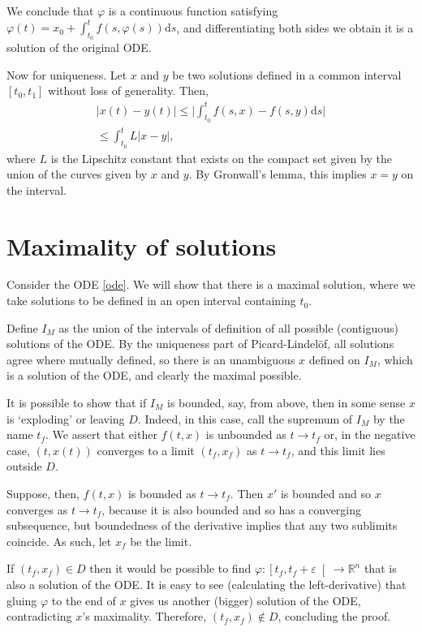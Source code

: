 \documentclass{article}
\newcommand{\R}{\mathbb{R}}
\newcommand{\dd}{\mathrm{d}}
\begin{document}
We conclude that $\varphi$ is a continuous function satisfying $\varphi(t) = x_0 + \int_{t_0}^t f(s, \varphi(s)) \dd s$, and differentiating both sides we obtain it is a solution of the original ODE.

Now for uniqueness. Let $x$ and $y$ be two solutions defined in a common interval $[t_0, t_1]$ without loss of generality. Then,
\begin{align*}
\lvert x(t) - y(t) \rvert \leq \lvert \int_{t_0}^t f(s,x) - f(s,y) \dd s \rvert\\
\leq \int_{t_0}^t L \lvert x - y \rvert,
\end{align*}
where $L$ is the Lipschitz constant that exists on the compact set given by the union of the curves given by $x$ and $y$. By Gronwall's lemma, this implies $x = y$ on the interval.

\section{Maximality of solutions}

Consider the ODE \eqref{ode}. We will show that there is a maximal solution, where we take solutions to be defined in an open interval containing $t_0$.

Define $I_M$ as the union of the intervals of definition of all possible (contiguous) solutions of the ODE. By the uniqueness part of Picard-Lindelöf, all solutions agree where mutually defined, so there is an unambiguous $x$ defined on $I_M$, which is a solution of the ODE, and clearly the maximal possible.

It is possible to show that if $I_M$ is bounded, say, from above, then in some sense $x$ is `exploding' or leaving $D$. Indeed, in this case, call the supremum of $I_M$ by the name $t_f$. We assert that either $f(t, x)$ is unbounded as $t \to t_f$ or, in the negative case, $(t, x(t))$ converges to a limit $(t_f, x_f)$ as $t \to t_f$, and this limit lies outside $D$.

Suppose, then, $f(t,x)$ is bounded as $t \to t_f$. Then $x'$ is bounded and so $x$ converges as $t \to t_f$, because it is also bounded and so has a converging subsequence, but boundedness of the derivative implies that any two sublimits coincide. As such, let $x_f$ be the limit.

If $(t_f, x_f) \in D$ then it would be possible to find $\varphi : \left[t_f, t_f + \varepsilon\right[ \to \R^n$ that is also a solution of the ODE. It is easy to see (calculating the left-derivative) that gluing $\varphi$ to the end of $x$ gives us another (bigger) solution of the ODE, contradicting $x$'s maximality. Therefore, $(t_f, x_f) \not \in D$, concluding the proof.
\end{document}
